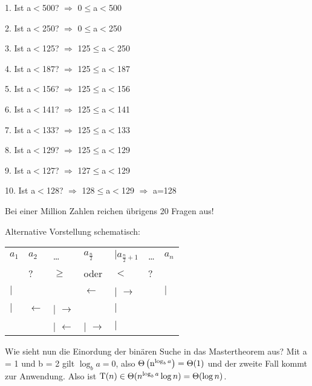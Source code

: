 \documentclass{scrreprt}%
\theoremstyle{break}
\begin{document}
1. Ist a$<$500? $\Rightarrow$ 0$\leq$a$<$500

2. Ist a$<$250? $\Rightarrow$ 0$\leq$a$<$250

3. Ist a$<$125? $\Rightarrow$ 125$\leq$a$<$250

4. Ist a$<$187? $\Rightarrow$ 125$\leq$a$<$187

5. Ist a$<$156? $\Rightarrow$ 125$\leq$a$<$156

6. Ist a$<$141? $\Rightarrow$ 125$\leq$a$<$141

7. Ist a$<$133? $\Rightarrow$ 125$\leq$a$<$133

8. Ist a$<$129? $\Rightarrow$ 125$\leq$a$<$129

9. Ist a$<$127? $\Rightarrow$ 127$\leq$a$<$129

10. Ist a$<$128? $\Rightarrow$ 128$\leq$a$<$129 $\Rightarrow$ a=128 

Bei einer Million Zahlen reichen übrigens 20 Fragen aus!
\bigskip

% 
Alternative Vorstellung schematisch:

\begin{tabular}{lllllll}
$a_1$     & $a_2$           & \dots   &  \( a_{\frac{n}{2}}\) & \( \vert a_{\frac{n}{2}+1}\) & \dots  & $a_n$ \\
          &       ?         & $\geq$  & oder                  & $<$                          &  ?     &\\
$\vert$   &                 &         & $\gets$               & $\vert$ $\to$                &        & $\vert$\\
$\vert$   & $\gets$ & $\vert$ $\to$ & & $\vert$\\
&         & $\vert$ $\gets$ & $\vert$ $\to$ & $\vert$
\end{tabular}
\bigskip

Wie sieht nun die Einordung der binären Suche in das Mastertheorem aus?
Mit a = 1 und b = 2 gilt \(\log_ba = 0\), also \(\Theta\left(\textup{n}^{\log_ba}\right)=\Theta(1)\) und der zweite Fall kommt zur Anwendung.
Also ist \(  \textup{T}(n) \in \Theta(n^{\log_ba}\log n)=\Theta(\log n) \).
\end{document}
